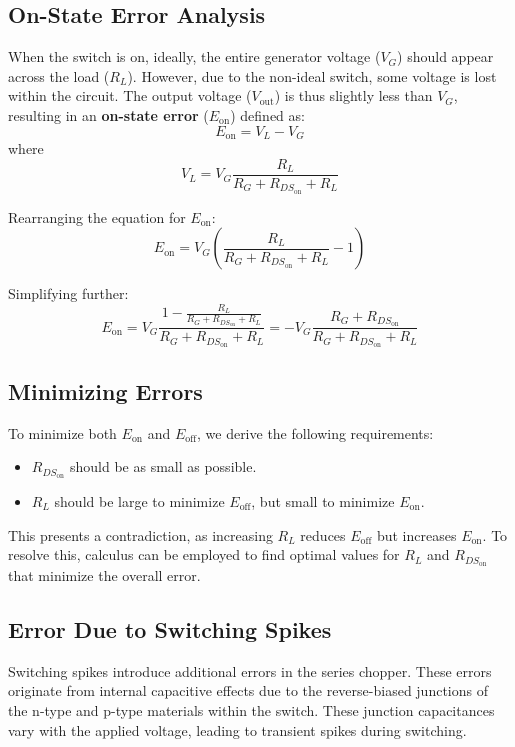 \subsection{On-State Error Analysis}
When the switch is on, ideally, the entire generator voltage (\( V_G \)) should appear across the load (\( R_L \)). However, due to the non-ideal switch, some voltage is lost within the circuit. The output voltage (\( V_{\text{out}} \)) is thus slightly less than \( V_G \), resulting in an \textbf{on-state error} (\( E_{\text{on}} \)) defined as:
\begin{equation}
E_{\text{on}} = V_L - V_G
\end{equation}
where
\begin{equation}
V_L = V_G \frac{R_L}{R_G + R_{DS_{\text{on}}} + R_L}
\end{equation}

Rearranging the equation for \( E_{\text{on}} \):
\begin{equation}
E_{\text{on}} = V_G \left( \frac{R_L}{R_G + R_{DS_{\text{on}}} + R_L} - 1 \right )
\end{equation}

Simplifying further:
\begin{equation}
E_{\text{on}} = V_G \frac{1 - \frac{R_L}{R_G + R_{DS_{\text{on}}} + R_L}}{R_G + R_{DS_{\text{on}}} + R_L} = -V_G \frac{R_G + R_{DS_{\text{on}}}}{R_G + R_{DS_{\text{on}}} + R_L}
\end{equation}

\subsection{Minimizing Errors}
To minimize both \( E_{\text{on}} \) and \( E_{\text{off}} \), we derive the following requirements:
\begin{itemize}
    \item \( R_{DS_{\text{on}}} \) should be as small as possible.
    \item \( R_L \) should be large to minimize \( E_{\text{off}} \), but small to minimize \( E_{\text{on}} \).
\end{itemize}

This presents a contradiction, as increasing \( R_L \) reduces \( E_{\text{off}} \) but increases \( E_{\text{on}} \). To resolve this, calculus can be employed to find optimal values for \( R_L \) and \( R_{DS_{\text{on}}} \) that minimize the overall error.

\subsection{Error Due to Switching Spikes}
Switching spikes introduce additional errors in the series chopper. These errors originate from internal capacitive effects due to the reverse-biased junctions of the n-type and p-type materials within the switch. These junction capacitances vary with the applied voltage, leading to transient spikes during switching.

